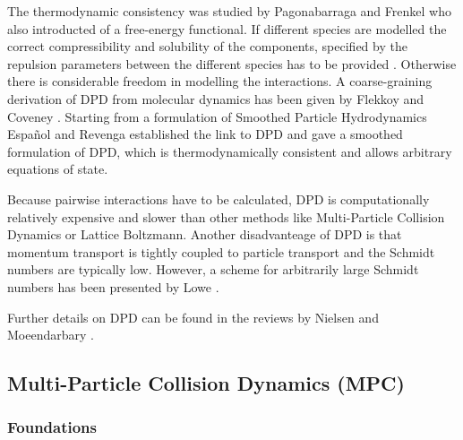 \documentclass[8.5pt,twoside,twocolumn]{article}
\begin{document}
The thermodynamic consistency was studied by Pagonabarraga and Frenkel \cite{Pagonabarraga:2001} who also
introducted of a free-energy functional.
If different species are modelled the correct compressibility and solubility of the components, 
specified by the repulsion parameters between the different species has to be provided \cite{Groot:1997}.
Otherwise there is considerable freedom in modelling the interactions.
A coarse-graining derivation of DPD from molecular dynamics has been given by 
Flekkoy and Coveney \cite{Flekkoy:1999, Flekkoy:2000}. Starting from a 
formulation of Smoothed Particle Hydrodynamics Espa\~nol and Revenga \cite{Espanol:2003} 
established the link to DPD and gave a smoothed formulation of DPD, which 
is thermodynamically consistent and allows arbitrary equations of state. 

Because pairwise interactions have to be calculated, DPD is computationally relatively expensive and  
slower than other methods like Multi-Particle Collision Dynamics or Lattice Boltzmann.
Another disadvanteage of DPD is that momentum transport is tightly coupled to particle transport and the Schmidt numbers 
are typically low. However, a scheme for arbitrarily large Schmidt numbers has been presented by Lowe \cite{Lowe:2004}.

Further details on DPD can be found in the reviews by Nielsen \cite{Nielsen:2004} and 
Moeendarbary \cite{Moeendarbary:2009, Moeendarbary:2010}.



\subsection{Multi-Particle Collision Dynamics (MPC)}


\subsubsection{Foundations}
\end{document}
